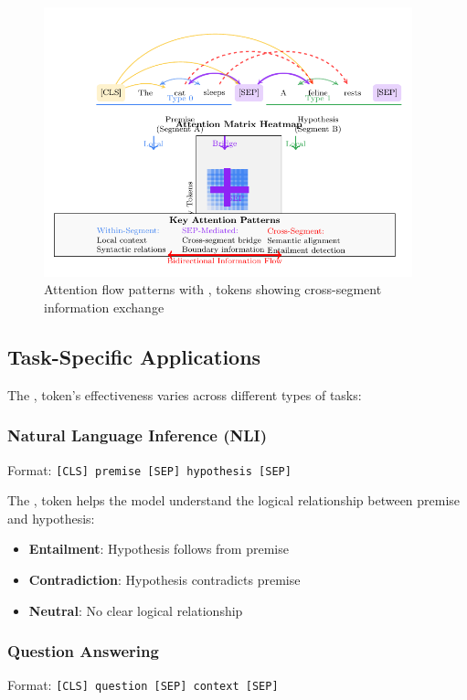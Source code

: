\begin{figure}[h]
\centering
\includegraphics[width=0.95\textwidth]{part1/chapter02/fig_sep_attention_flow.pdf}
\caption{Attention flow patterns with \sep{} tokens showing cross-segment information exchange}
\label{fig:sep_attention_flow}
\end{figure}

\subsection{Task-Specific Applications}

The \sep{} token's effectiveness varies across different types of tasks:

\subsubsection{Natural Language Inference (NLI)}
Format: \texttt{[CLS] premise [SEP] hypothesis [SEP]}

The \sep{} token helps the model understand the logical relationship between premise and hypothesis:
\begin{itemize}
\item \textbf{Entailment}: Hypothesis follows from premise
\item \textbf{Contradiction}: Hypothesis contradicts premise  
\item \textbf{Neutral}: No clear logical relationship
\end{itemize}

\subsubsection{Question Answering}
Format: \texttt{[CLS] question [SEP] context [SEP]}

